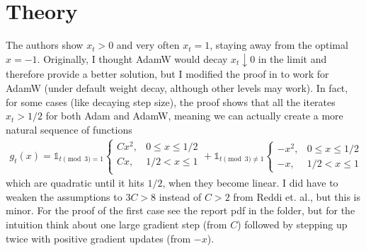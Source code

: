 \documentclass[landscape,twocolumn]{article}
\newcommand{\1}{\mathds{1}}
\begin{document}
\section*{Theory}
The authors show \(x_t>0\) and very often \(x_t=1\), staying away from the optimal \(x=-1\). Originally, I thought AdamW would decay \(x_t\downarrow 0\) in the limit and therefore provide a better solution, but I modified the proof in \cite{reddi2019convergence} to work for AdamW (under default weight decay, although other levels may work). In fact, for some cases (like decaying step size), the proof shows that all the iterates \(x_t>1/2\) for both Adam and AdamW, meaning we can actually create a more natural sequence of functions 
\begin{align*}
g_t(x) = \1_{t\pmod{3} = 1}\begin{cases}
    Cx^2, &  0\leq x \leq 1/2  \\
    Cx ,   &1/2 < x \leq 1  \\
\end{cases} + \1_{t\pmod{3} \neq 1}\begin{cases}
    -x^2, &    0\leq x \leq 1/2 \\ 
    -x , &  1/2 < x \leq 1
\end{cases}
\end{align*}
which are quadratic until it hits \(1/2\), when they become linear. I did have to weaken the assumptions to \(3C>8\) instead of \(C>2\) from Reddi et. al., but this is minor. For the proof of the first case see the report pdf in the folder, but for the intuition think about one large gradient step (from \(C\)) followed by stepping up twice with positive gradient updates (from \(-x\)). 
\end{document}
